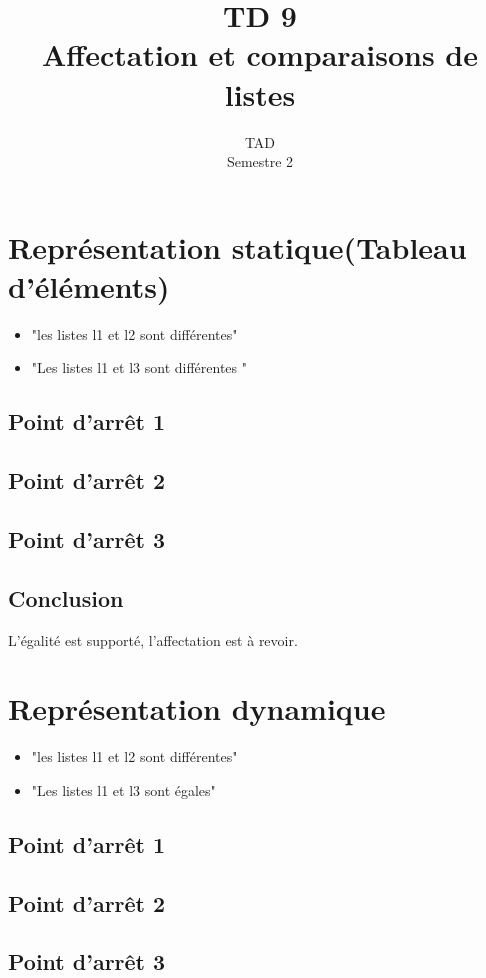 \documentclass{article}
\title{TD 9\\ Affectation et comparaisons de listes}
\date{TAD\\ Semestre 2}
\begin{document}
	\maketitle
	\section{Représentation statique(Tableau d'éléments)}
	\begin{itemize}
		\item "les listes l1 et l2 sont différentes" 
		\item "Les listes l1 et l3 sont différentes "
	\end{itemize}
	\subsection{Point d'arrêt 1}
		
	\subsection{Point d'arrêt 2}
		
	\subsection{Point d'arrêt 3}
		
	\subsection{Conclusion}
	L'égalité est supporté, l'affectation est à revoir.
	\section{Représentation dynamique}
	\begin{itemize}
		\item "les listes l1 et l2 sont différentes" 
		\item "Les listes l1 et l3 sont égales"
	\end{itemize}
	\subsection{Point d'arrêt 1}
		
	\subsection{Point d'arrêt 2}
		
	\subsection{Point d'arrêt 3}
		
\end{document}

